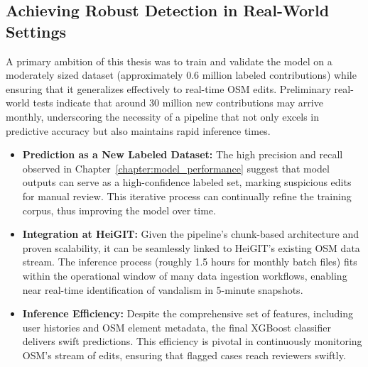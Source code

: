 \documentclass[
    13pt, %
    a4paper, %
    listof=totoc, %
    bibliography=totoc, %
    index=totoc, %
    headsepline
]{scrreprt}
\begin{document}
\subsection{Achieving Robust Detection in Real-World Settings}
A primary ambition of this thesis was to train and validate the model on a moderately sized dataset (approximately 0.6 million labeled contributions) while ensuring that it generalizes effectively to real-time OSM edits. Preliminary real-world tests indicate that around 30 million new contributions may arrive monthly, underscoring the necessity of a pipeline that not only excels in predictive accuracy but also maintains rapid inference times.
\begin{itemize}
    \item \textbf{Prediction as a New Labeled Dataset:} The high precision and recall observed in Chapter~\ref{chapter:model_performance} suggest that model outputs can serve as a high-confidence labeled set, marking suspicious edits for manual review. This iterative process can continually refine the training corpus, thus improving the model over time.
    \item \textbf{Integration at HeiGIT:} Given the pipeline’s chunk-based architecture and proven scalability, it can be seamlessly linked to HeiGIT’s existing OSM data stream. The inference process (roughly 1.5 hours for monthly batch files) fits within the operational window of many data ingestion workflows, enabling near real-time identification of vandalism in 5-minute snapshots.
    \item \textbf{Inference Efficiency:} Despite the comprehensive set of features, including user histories and OSM element metadata, the final XGBoost classifier delivers swift predictions. This efficiency is pivotal in continuously monitoring OSM’s stream of edits, ensuring that flagged cases reach reviewers swiftly.
\end{itemize}
\end{document}
